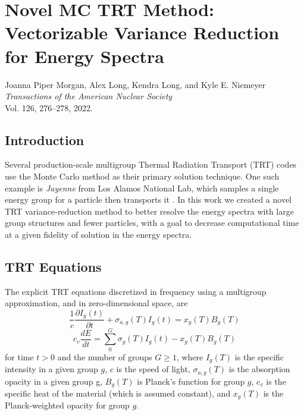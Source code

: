 \renewcommand{\TheTitle}{Novel MC TRT Method: Vectorizable Variance Reduction for Energy Spectra}
\renewcommand{\TheAuthors}{%
  Joanna Piper Morgan,
  Alex Long,
  Kendra Long, 
  and Kyle E. Niemeyer}
  
\renewcommand{\TheAddress}{%
    \textit{Transactions of the American Nuclear Society} \\
    Vol. 126, 276--278, 2022. \\
    \doi{10.13182/T126-38066}
}

\chapter{\TheTitle}
\label{chapter:trt_paper}

\vspace{1em}
\TheAuthors
\vspace{1em}
\TheAddress
\vspace{1em}


\section{Introduction}
Several production-scale multigroup Thermal Radiation Transport (TRT) codes use the Monte Carlo method as their primary solution technique.
One such example is \textit{Jayenne} from Los Alamos National Lab, which samples a single energy group for a particle then transports it \cite{Thompson_2021}. 
In this work we created a novel TRT variance-reduction method to better resolve the energy spectra with large group structures and fewer particles, with a goal to decrease computational time at a given fidelity of solution in the energy spectra.

\section{TRT Equations}

The explicit TRT equations discretized in frequency using a multigroup approximation, and in zero-dimensional space, are \cite{Pomraning1973}
\begin{equation}
    \frac{1}{c}\frac{\partial I_g(t)}{\partial t} + \sigma_{a,g}(T)I_{g}(t) = x_{g}(T)B_{g}(T)
\end{equation}
%
\begin{equation}
    c_{v}\frac{dE}{dt} = \sum_{0}^{G}{\sigma_{g}(T)I_{g}(t) - x_{g}(T)B_{g}(T)}
\end{equation}
for time $t>0$ and the number of groups $G \geq 1$, where $I_{g}(T)$ is the specific intensity in a given group $g$, $c$ is the speed of light, $\sigma_{a,g}(T)$ is the absorption opacity in a given group g, $B_{g}(T)$ is Planck's function for group $g$, $c_v$ is the specific heat of the material (which is assumed constant), and $x_{g}(T)$ is the Planck-weighted opacity for group $g$.

